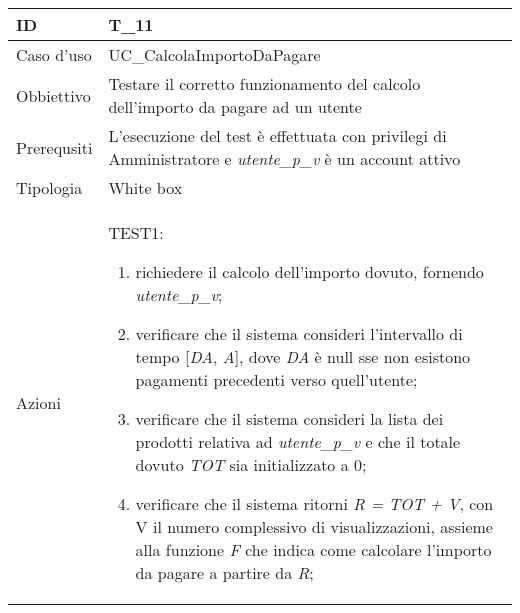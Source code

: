 \begin{table}[hb]
    \centering
    \begin{tabular}{ |p{2cm}|p{10cm}|  }
        \hline
        ID          & T\_11                                                                                                        \\\hline
        Caso d'uso  & UC\_CalcolaImportoDaPagare                                                                                   \\\hline
        Obbiettivo  & Testare il corretto funzionamento del calcolo dell'importo da pagare ad un utente                            \\\hline
        Prerequsiti & L'esecuzione del test è effettuata con privilegi di Amministratore e \emph{utente\_p\_v} è un account attivo \\\hline
        Tipologia   & White box                                                                                                    \\\hline
        Azioni      &
        TEST1:
        \begin{enumerate}[nosep, topsep=0pt]
            \item richiedere il calcolo dell'importo dovuto, fornendo \emph{utente\_p\_v};
            \item verificare che il sistema consideri l'intervallo di tempo [\emph{DA}, \emph{A}], dove \emph{DA} è null sse non esistono pagamenti precedenti verso quell'utente;
            \item verificare che il sistema consideri la lista dei prodotti relativa ad \emph{utente\_p\_v} e che il totale dovuto \emph{TOT} sia initializzato a 0;
            \item verificare che il sistema ritorni \emph{R = TOT + V}, con V il numero complessivo di visualizzazioni, assieme alla funzione \emph{F} che indica come calcolare l'importo da pagare a partire da \emph{R};
        \end{enumerate}
        \\\hline
    \end{tabular}
\end{table}

